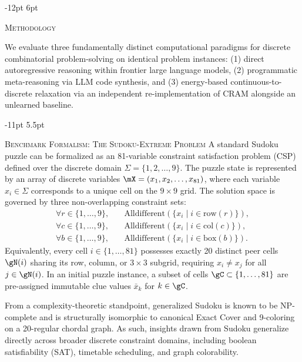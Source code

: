 \documentclass{article} %
\makeatletter
\renewcommand\section{\@startsection{section}{1}{\z@}%
  {-12pt \@plus -3pt \@minus -2pt}%
  {6pt \@plus 2pt}%
  {\normalfont\fontsize{12}{14}\selectfont\scshape\raggedright}}
\renewcommand\subsection{\@startsection{subsection}{2}{\z@}%
  {-11pt \@plus -3pt \@minus -2pt}%
  {5.5pt \@plus 2pt}%
  {\normalfont\fontsize{10}{12}\selectfont\scshape\raggedright}}
\makeatother
\begin{document}
\section{\textsc{Methodology}}
\label{sec:method}

We evaluate three fundamentally distinct computational paradigms for discrete combinatorial problem-solving on identical problem instances: (1) direct autoregressive reasoning within frontier large language models, (2) programmatic meta-reasoning via LLM code synthesis, and (3) energy-based continuous-to-discrete relaxation via an independent re-implementation of CRAM alongside an unlearned baseline.

\subsection{\textsc{Benchmark Formalism: The Sudoku-Extreme Problem}}
\label{sec:method_benchmark}
A standard Sudoku puzzle can be formalized as an 81-variable constraint satisfaction problem (CSP) defined over the discrete domain $\Sigma = \{1, 2, \dots, 9\}$. The puzzle state is represented by an array of discrete variables $\mX = (x_1, x_2, \dots, x_{81})$, where each variable $x_i \in \Sigma$ corresponds to a unique cell on the $9 \times 9$ grid. The solution space is governed by three non-overlapping constraint sets:
\begin{align}
    \forall r \in \{1, \dots, 9\}, \quad & \text{Alldifferent}(\{x_i \mid i \in \text{row}(r)\}), \\
    \forall c \in \{1, \dots, 9\}, \quad & \text{Alldifferent}(\{x_i \mid i \in \text{col}(c)\}), \\
    \forall b \in \{1, \dots, 9\}, \quad & \text{Alldifferent}(\{x_i \mid i \in \text{box}(b)\}).
\end{align}
Equivalently, every cell $i \in \{1, \dots, 81\}$ possesses exactly 20 distinct peer cells $\gN(i)$ sharing its row, column, or $3 \times 3$ subgrid, requiring $x_i \neq x_j$ for all $j \in \gN(i)$. In an initial puzzle instance, a subset of cells $\gC \subset \{1, \dots, 81\}$ are pre-assigned immutable clue values $\bar{x}_k$ for $k \in \gC$.

From a complexity-theoretic standpoint, generalized Sudoku is known to be NP-complete and is structurally isomorphic to canonical Exact Cover and 9-coloring on a 20-regular chordal graph. As such, insights drawn from Sudoku generalize directly across broader discrete constraint domains, including boolean satisfiability (SAT), timetable scheduling, and graph colorability.
\end{document}
